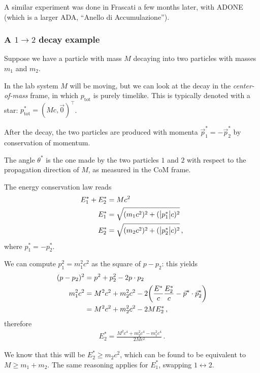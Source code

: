 \documentclass[main.tex]{subfiles}
\begin{document}
A similar experiment was done in Frascati a few months later, with ADONE (which is a larger ADA, ``Anello di Accumulazione'').

\subsubsection{A \(1 \to 2\) decay example}

Suppose we have a particle with mass \(M\) decaying into two particles with masses \(m_1 \) and \(m_2 \). 

In the lab system \(M\) will be moving, but we can look at the decay in the \emph{center-of-mass} frame, in which \(p _{\text{tot}}\) is purely timelike. 
This is typically denoted with a star: \(p^{*} _{\text{tot}} = (M c, \vec{0})^{\top}\). 

After the decay, the two particles are produced with momenta \(\vec{p}^{*}_1 = -\vec{p}^{*}_2\) by conservation of momentum. 

The angle \(\theta^{*}\) is the one made by the two particles \(1\) and \(2\) with respect to the propagation direction of \(M\), as measured in the CoM frame. 

The energy conservation law reads  
%
\begin{align}
E^{*}_{1} + E^{*}_{2} &= Mc^2 \\
E^{*}_{1} &= \sqrt{(m_1 c^2)^2 + (\abs{p^{*}_1} c)^2}\\
E^{*}_{2} &= \sqrt{(m_2 c^2)^2 + (\abs{p^{*}_2} c)^2}
\,,
\end{align}
%
where \(p^{*}_{1} = - p^{*}_{2}\). 

We can compute \(p_1^2 = m_1^2 c^2\) as the square of \(p - p_2 \): this yields 
%
\begin{align}
(p - p_2)^2 &= p^2 + p_2^2 - 2 p \cdot p_2   \\
m_1^2 c^2 &= M^2 c^2 +  m_2^2 c^2 - 2 \qty( \frac{E^{*}}{c} \frac{E^{*}_2}{c} - \vec{p}^{*} \cdot \vec{p}^{*}_{2})  \\
&= M^2c^2 + m_2^2c^2 - 2 M E^{*}_{2}
\,,
\end{align}
%
therefore 
%
\begin{align}
E^{*}_2 = \frac{M^2 c^4 + m_2^2 c^4 - m_1^2 c^4}{2Mc^2}
\,.
\end{align}

We know that this will be \(E^{*}_{2} \geq m_2c^2\), which can be found to be equivalent to \(M \geq m_1 + m_2 \). 
The same reasoning applies for \(E^{*}_{1}\), swapping \(1 \leftrightarrow 2\). 
\end{document}
